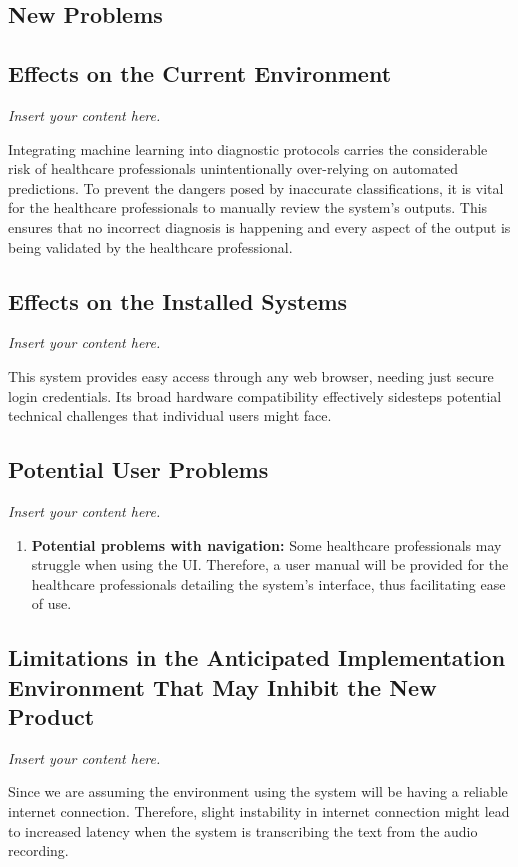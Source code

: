 \documentclass[12pt]{article}
\newcommand{\lips}{\textit{Insert your content here.}}
\begin{document}
\begin{itemize}
\section{New Problems}
\subsection{Effects on the Current Environment}
\lips

Integrating machine learning into diagnostic protocols carries the considerable risk of healthcare professionals unintentionally over-relying on automated predictions. To prevent the dangers posed by inaccurate classifications, it is vital for the healthcare professionals to manually review the system's outputs. This ensures that no incorrect diagnosis is happening and every aspect of the output is being validated by the healthcare professional.

\subsection{Effects on the Installed Systems}
\lips

This system provides easy access through any web browser, needing just secure login credentials. Its broad hardware compatibility effectively sidesteps potential technical challenges that individual users might face.

\subsection{Potential User Problems}
\lips

\begin{enumerate}
  \item \textbf{Potential problems with navigation:} Some healthcare professionals may struggle when using the UI. Therefore, a user manual will be provided for the healthcare professionals detailing the system's interface, thus facilitating ease of use.
\end{enumerate}

\subsection{Limitations in the Anticipated Implementation Environment That May
Inhibit the New Product}
\lips

Since we are assuming the environment using the system will be having a reliable internet connection. Therefore, slight instability in internet connection might lead to increased latency when the system is transcribing the text from the audio recording. 


\end{itemize}
\end{document}
